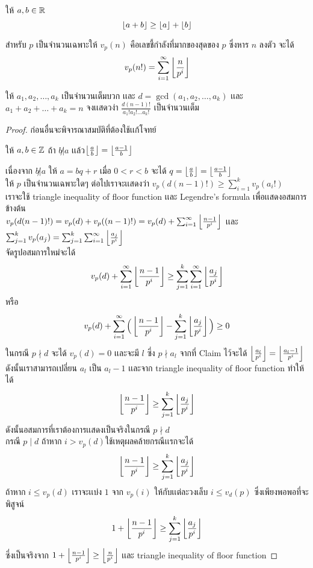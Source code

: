 \documentclass[a4paper,12pt]{scrartcl}
\begin{document}
	\begin{theorem*} ให้ $a,b \in \mathbb R$
		\[ \left\lfloor a+b \right\rfloor \ge \left\lfloor a \right\rfloor+ \left\lfloor b \right\rfloor \]

	\end{theorem*}
	\begin{theorem*}
		สำหรับ $p$ เป็นจำนวนเฉพาะให้ $v_p(n)$ คือเลขชี้กำลังที่มากของสุดของ $p$ ซึ่งหาร $n$ ลงตัว จะได้ \[ v_p(n!) = \sum_{i=1}^{\infty} \left\lfloor \frac{n}{p^i} \right\rfloor \]

	\end{theorem*}
	\begin{example}
		ให้ $a_1,a_2,\dots,a_k$ เป็นจำนวนเต็มบวก เเละ $d = \gcd(a_1,a_2,\dots,a_k) $ เเละ \\ $a_1+a_2+\dots+a_k = n$ จงเเสดวง่า $\frac{d(n-1)!}{a_1!a_2!\dots a_k!}$ เป็นจำนวนเต็ม
	\end{example}
\begin{proof}
ก่อนอื่นจะพิจารณาสมบัติที่ต้องใช้เเก้โจทย์
	\begin{claim*}
		ให้ $a,b \in \mathbb Z$ ถ้า $b \not | a$ เเล้ว$ \left\lfloor \frac{a}{b} \right\rfloor =\left\lfloor \frac{a-1}{b} \right\rfloor$
	\end{claim*}
เนื่องจาก $b \not | a$ ให้ $a = bq+r$ เมื่อ $0<r <b$ จะได้ $q= \left\lfloor \frac{a}{b} \right\rfloor=\left\lfloor \frac{a-1}{b} \right\rfloor$ \\ ให้ $p$ เป็นจำนวนเฉพาะใดๆ
ต่อไปเราจะเเสดงว่า $v_p(d(n-1)!) \ge \sum_{i=1}^{k} {v_p(a_i!)}$\\
เราจะใช้ triangle inequality of floor function เเละ Legendre's formula เพื่อเเสดงอสมการข้างต้น\\
$v_p(d(n-1)!) = v_p(d)+v_p((n-1)!) = v_p(d) + \sum_{i=1}^{\infty} \left\lfloor \frac{n-1}{p^i} \right\rfloor$ เเละ $ \sum_{j=1}^{k}v_p{(a_j)} = \sum_{j=1}^{k}\sum_{i=1}^{\infty} \left\lfloor \frac{a_j}{p^i} \right\rfloor$ \\
จัดรูปอสมการใหม่จะได้ \[ v_p(d) + \sum_{i=1}^{\infty} \left\lfloor \frac{n-1}{p^i} \right\rfloor \ge \sum_{j=1}^{k}\sum_{i=1}^{\infty} \left\lfloor \frac{a_j}{p^i} \right\rfloor  \] หรือ 
\[	v_p(d) + \sum_{i=1}^{\infty}\Big( \left\lfloor \frac{n-1}{p^i} \right\rfloor -\sum_{j=1}^{k}\left\lfloor \frac{a_j}{p^i} \right\rfloor  \Big) \ge 0 \]
ในกรณี $p\nmid d$ จะได้ $v_p(d)=0$ เเละจะมี $l$ ซึ่ง  $p \nmid  a_l$ จากที่ Claim ไว้จะได้ $\left\lfloor \frac{a_l}{p^i} \right\rfloor = \left\lfloor \frac{a_l-1}{p^i} \right\rfloor$
 ดังนั้นเราสามารถเปลี่ยน $a_l$ เป็น $a_l-1$ เเละจาก  triangle inequality of floor function ทำให้ได้ \[ \left\lfloor \frac{n-1}{p^i} \right\rfloor \ge \sum_{j=1}^{k}\left\lfloor \frac{a_j}{p^i} \right\rfloor \]
 ดังนั้นอสมการที่เราต้องการเเสดงเป็นจริงในกรณี $p \nmid d $ \\
กรณี $ p \mid d$ ถ้าหาก $i > v_p(d) $ใช้เหตุผลคล้ายกรณีเเรกจะได้  \[ \left\lfloor \frac{n-1}{p^i} \right\rfloor \ge \sum_{j=1}^{k}\left\lfloor \frac{a_j}{p^i} \right\rfloor \] ถ้าหาก $i \le v_p(d)$ เราจะเเบ่ง $1$ จาก $v_p(i)$ ให้กับเเต่ละวงเล็บ $i \le v_d(p)$ ซึ่งเพียงพอพอที่จะพิสูจน์ \[ 1 + \left\lfloor \frac{n-1}{p^i} \right\rfloor \ge \sum_{j=1}^{k}\left\lfloor \frac{a_j}{p^i} \right\rfloor \] ซึ่งเป็นจริงจาก $1 + \left\lfloor \frac{n-1}{p^i} \right\rfloor \ge \left\lfloor \frac{n}{p^i} \right\rfloor$ เเละ  triangle inequality of floor function
\end{proof}
\end{document}

